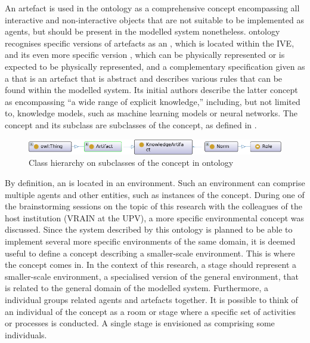  An artefact is used in the  ontology as a comprehensive concept encompassing all interactive and non-interactive objects that are not suitable to be implemented as agents, but should be present in the modelled system nonetheless.  ontology recognises specific versions of artefacts as an , which is located within the \ac{IVE}, and its even more specific version , which can be physically represented or is expected to be physically represented, and a complementary specification given as a  that is an artefact that is abstract and describes various rules that can be found within the modelled system. Its initial authors describe the latter concept as encompassing \enquote{a wide range of explicit knowledge,} including, but not limited to, knowledge models, such as machine learning models or neural networks. The  concept and its subclass  are subclasses of the  concept,
%
as defined in .

\begin{figure}
    \centering
    \includegraphics[width=0.84\linewidth]{Deliverables/Phase 1.1/Figures/Hierarchy artefact KNartefact norm role.png}
    \caption{Class hierarchy on subclasses of the  concept in  ontology}
    \label{fig:Hierarchy artefact KNartefact norm role}
\end{figure}

 By definition, an  is located in an environment. Such an environment can comprise multiple agents and other entities, such as instances of the  concept. During one of the brainstorming sessions on the topic of this research with the colleagues of the host institution (\acf{VRAIN} at the \ac{UPV}), a more specific environmental concept was discussed. Since the system described by this ontology is planned to be able to implement several more specific environments of the same domain, it is deemed useful to define a concept describing a smaller-scale environment. This is where the  concept comes in. In the context of this research, a stage should represent a smaller-scale environment, a specialised version of the general environment, that is related to the general domain of the modelled system.
Furthermore, a  individual groups related agents and artefacts together. It is possible to think of an individual of the  concept as a room or stage where a specific set of activities or processes is conducted. A single stage is envisioned as comprising some  individuals.

